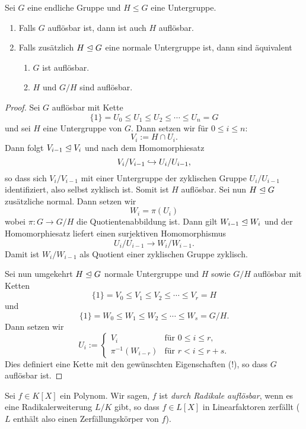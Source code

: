 \documentclass{book}
\begin{document}
\begin{lem}
    \label{lem:auflösbar} Sei $G$ eine endliche Gruppe und $H \le G$ eine Untergruppe. 
    \begin{enumerate}
        \item Falls $G$ auflösbar ist, dann ist auch $H$ auflösbar. 
        \item Falls zusätzlich $H \trianglelefteq G$ eine normale Untergruppe ist, dann sind äquivalent
            \begin{enumerate}[label=(\roman *)]
                \item $G$ ist auflösbar.
                \item $H$ und $G/H$ sind auflösbar. 
            \end{enumerate}
    \end{enumerate}
\end{lem}
\begin{proof}
    Sei $G$ auflösbar mit Kette
    \[
        \{1\} = U_0 \le U_1  \le U_2 \le \cdots \le U_n = G
    \]
    und sei $H$ eine Untergruppe von $G$. 
    Dann setzen wir für $0 \le i \le n$:
    \[
        V_i := H \cap U_i.
    \]
    Dann folgt $V_{i-1} \trianglelefteq V_{i}$ und nach dem Homomorphiesatz
    \[
        V_i/V_{i-1} \hookrightarrow U_i/U_{i-1},
    \]
    so dass sich $V_i/V_{i-1}$ mit einer Untergruppe der zyklischen Gruppe
    $U_i/U_{i-1}$ identifiziert, also selbst zyklisch ist. Somit ist $H$
    auflösbar. Sei nun $H \trianglelefteq G$ zusätzliche normal. Dann setzen wir
    \[
        W_i = \pi(U_i)
    \]
    wobei $\pi: G \to G/H$ die Quotientenabbildung ist. Dann gilt $W_{i-1} \trianglelefteq
    W_i$ und der Homomorphiesatz liefert einen surjektiven Homomorphismus
    \[
        U_i/U_{i-1} \to W_i/W_{i-1}.
    \]
    Damit ist $W_i/W_{i-1}$ als Quotient einer zyklischen Gruppe zyklisch. 

    Sei nun umgekehrt $H \trianglelefteq G$ normale Untergruppe und $H$ sowie $G/H$ auflösbar mit Ketten
    \[
        \{1\} = V_0 \le V_1  \le V_2 \le \cdots \le V_r = H
    \]
    und
    \[
        \{1\} = W_0 \le W_1  \le W_2 \le \cdots \le W_s = G/H.
    \]
    Dann setzen wir 
    \[
        U_i := \begin{cases} V_i & \text{für $0 \le i \le r$,}\\
        \pi^{-1}(W_{i-r}) & \text{für $r < i \le r+s$.} \end{cases}
    \]
    Dies definiert eine Kette mit den gewünschten Eigenschaften (!), so dass $G$
    auflösbar ist. 
\end{proof}

\begin{defi}
    \label{defi:radikaleauf}
        Sei $f \in K[X]$ ein Polynom. Wir sagen, $f$ ist {\em durch
        Radikale auflösbar}, wenn es eine Radikalerweiterung $L/K$ gibt, so
        dass $f \in L[X]$ in Linearfaktoren zerfällt ($L$ enthält also
        einen Zerfällungskörper von $f$). 
\end{defi}
\end{document}

